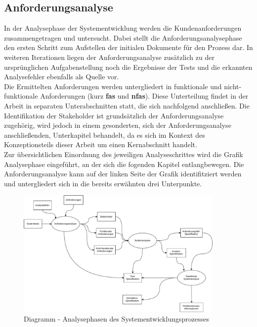 \documentclass[../../../Bachelorarbeit.tex]{subfiles}
\begin{document}
\subsection{Anforderungsanalyse} \label{anforderungsana}
In der Analysephase der Systementwicklung werden die Kundenanforderungen zusammengetragen und untersucht. %
Dabei stellt die Anforderungsanalysephase den ersten Schritt zum Aufstellen der initialen Dokumente für den Prozess dar. In weiteren Iterationen liegen der Anforderungsanalyse zusätzlich zu der ursprünglichen Aufgabenstellung noch die Ergebnisse der Tests und die erkannten Analysefehler ebenfalls als Quelle vor.\\
Die Ermittelten Anforderungen werden untergliedert in funktionale und nicht-funktionale Anforderungen (kurz \textbf{\acsp{fa}} und \textbf{\acsp{nfa}}). Diese Unterteilung findet in der Arbeit in separaten Unterabschnitten statt, die sich nachfolgend anschließen. Die Identifikation der Stakeholder ist grundsätzlich der Anforderungsanalyse zugehörig, wird jedoch in einem gesonderten, sich der Anforderungsanalyse anschließenden, Unterkapitel behandelt, da es sich im Kontext des Konzeptionsteils dieser Arbeit um einen Kernabschnitt handelt.\\
Zur übersichtlichen Einordnung des jeweiligen Analyseschrittes wird die Grafik Analysephase eingeführt, an der sich die fogenden Kapitel entlangbewegen. Die Anforderungsanalyse kann auf der linken Seite der Grafik identifitziert werden und untergliedert sich in die bereits erwähnten drei Unterpunkte.\\

\begin{figure}[H]
    \centering
    \includegraphics[width=0.9\textwidth]{Images/AnalyseDiagramm.vpd.pdf}
    \caption[Analysephasen]{Diagramm - Analysephasen des Systementwicklungsprozesses}
    \label{fig:my-img8}
\end{figure}
\end{document}
